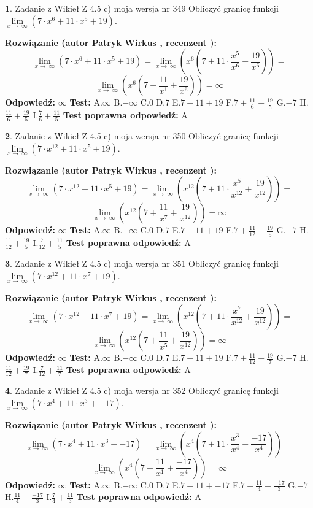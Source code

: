 \documentclass[12pt, a4paper]{article}
\theoremstyle{definition} %
\newtheorem{zad}{}
\newcommand{\zadStart}[1]{\begin{zad}#1\newline}
\newcommand{\zadStop}{\end{zad}}
\newcommand{\rozwStart}[2]{\noindent \textbf{Rozwiązanie (autor #1 , recenzent #2): }\newline}
\newcommand{\rozwStop}{\newline}
\newcommand{\odpStart}{\noindent \textbf{Odpowiedź:}\newline}
\newcommand{\odpStop}{\newline}
\newcommand{\testStart}{\noindent \textbf{Test:}\newline}
\newcommand{\testStop}{\newline}
\newcommand{\kluczStart}{\noindent \textbf{Test poprawna odpowiedź:}\newline}
\newcommand{\kluczStop}{\newline}
\begin{document}
\zadStart{Zadanie z Wikieł Z 4.5 c) moja wersja nr 349}
Obliczyć granicę funkcji  $\lim\limits_{x\to\ \infty}(7 \cdot x^{6}+11 \cdot x^{5}+19)$.
\zadStop
\rozwStart{Patryk Wirkus}{}
$$\lim\limits_{x\to\ \infty}(7 \cdot x^{6}+11 \cdot x^{5}+19) = \lim\limits_{x\to\ \infty}(x^{6}(7 +11 \cdot \frac{x^{5}}{x^{6}}+\frac{19}{x^{6}})) =$$ $$\lim\limits_{x\to\ \infty}(x^{6}(7 +\frac{11}{x^{1}}+\frac{19}{x^{6}})) =\infty$$
\rozwStop
\odpStart
$\infty$
\odpStop
\testStart
A.$\infty$ B.$-\infty$ C.$0$ D.$7$ E.$7 + 11 + 19$
F.$7+\frac{11}{6}+\frac{19}{5}$ G.$-7$
H.$\frac{11}{6}+\frac{19}{5}$
I.$\frac{7}{6}+\frac{11}{5}$
\testStop
\kluczStart
A
\kluczStop



\zadStart{Zadanie z Wikieł Z 4.5 c) moja wersja nr 350}
Obliczyć granicę funkcji  $\lim\limits_{x\to\ \infty}(7 \cdot x^{12}+11 \cdot x^{5}+19)$.
\zadStop
\rozwStart{Patryk Wirkus}{}
$$\lim\limits_{x\to\ \infty}(7 \cdot x^{12}+11 \cdot x^{5}+19) = \lim\limits_{x\to\ \infty}(x^{12}(7 +11 \cdot \frac{x^{5}}{x^{12}}+\frac{19}{x^{12}})) =$$ $$\lim\limits_{x\to\ \infty}(x^{12}(7 +\frac{11}{x^{7}}+\frac{19}{x^{12}})) =\infty$$
\rozwStop
\odpStart
$\infty$
\odpStop
\testStart
A.$\infty$ B.$-\infty$ C.$0$ D.$7$ E.$7 + 11 + 19$
F.$7+\frac{11}{12}+\frac{19}{5}$ G.$-7$
H.$\frac{11}{12}+\frac{19}{5}$
I.$\frac{7}{12}+\frac{11}{5}$
\testStop
\kluczStart
A
\kluczStop



\zadStart{Zadanie z Wikieł Z 4.5 c) moja wersja nr 351}
Obliczyć granicę funkcji  $\lim\limits_{x\to\ \infty}(7 \cdot x^{12}+11 \cdot x^{7}+19)$.
\zadStop
\rozwStart{Patryk Wirkus}{}
$$\lim\limits_{x\to\ \infty}(7 \cdot x^{12}+11 \cdot x^{7}+19) = \lim\limits_{x\to\ \infty}(x^{12}(7 +11 \cdot \frac{x^{7}}{x^{12}}+\frac{19}{x^{12}})) =$$ $$\lim\limits_{x\to\ \infty}(x^{12}(7 +\frac{11}{x^{5}}+\frac{19}{x^{12}})) =\infty$$
\rozwStop
\odpStart
$\infty$
\odpStop
\testStart
A.$\infty$ B.$-\infty$ C.$0$ D.$7$ E.$7 + 11 + 19$
F.$7+\frac{11}{12}+\frac{19}{7}$ G.$-7$
H.$\frac{11}{12}+\frac{19}{7}$
I.$\frac{7}{12}+\frac{11}{7}$
\testStop
\kluczStart
A
\kluczStop



\zadStart{Zadanie z Wikieł Z 4.5 c) moja wersja nr 352}
Obliczyć granicę funkcji  $\lim\limits_{x\to\ \infty}(7 \cdot x^{4}+11 \cdot x^{3}+-17)$.
\zadStop
\rozwStart{Patryk Wirkus}{}
$$\lim\limits_{x\to\ \infty}(7 \cdot x^{4}+11 \cdot x^{3}+-17) = \lim\limits_{x\to\ \infty}(x^{4}(7 +11 \cdot \frac{x^{3}}{x^{4}}+\frac{-17}{x^{4}})) =$$ $$\lim\limits_{x\to\ \infty}(x^{4}(7 +\frac{11}{x^{1}}+\frac{-17}{x^{4}})) =\infty$$
\rozwStop
\odpStart
$\infty$
\odpStop
\testStart
A.$\infty$ B.$-\infty$ C.$0$ D.$7$ E.$7 + 11 + -17$
F.$7+\frac{11}{4}+\frac{-17}{3}$ G.$-7$
H.$\frac{11}{4}+\frac{-17}{3}$
I.$\frac{7}{4}+\frac{11}{3}$
\testStop
\kluczStart
A
\kluczStop
\end{document}
